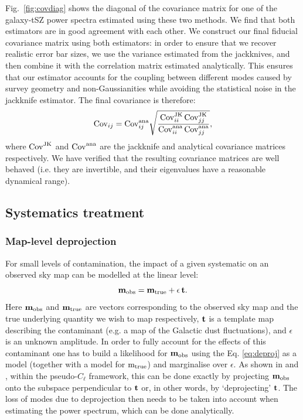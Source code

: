 \documentclass[useAMS,usenatbib]{mn2e}
\begin{document}
    Fig.\!~\ref{fig:covdiag} shows the diagonal of the covariance matrix for one of the galaxy-tSZ power spectra estimated using these two methods. We find that both estimators are in good agreement with each other. We construct our final fiducial covariance matrix using both estimators: in order to ensure that we recover realistic error bar sizes, we use the variance estimated from the jackknives, and then combine it with the correlation matrix estimated analytically. This ensures that our estimator accounts for the coupling between different modes caused by survey geometry and non-Gaussianities while avoiding the statistical noise in the jackknife estimator. The final covariance is therefore:
    \begin{equation}
      {\rm Cov}_{ij} = {\rm Cov}^{\rm ana}_{ij} \sqrt{\frac{{\rm Cov}^{\rm JK}_{ii}\,{\rm Cov}^{\rm JK}_{jj}}{{\rm Cov}^{\rm ana}_{ii}\,{\rm Cov}^{\rm ana}_{jj}}},
    \end{equation}
    where ${\rm Cov}^{\rm JK}$ and ${\rm Cov}^{\rm ana}$ are the jackknife and analytical covariance matrices respectively. We have verified that the resulting covariance matrices are well behaved (i.e. they are invertible, and their eigenvalues have a reasonable dynamical range).

  \subsection{Systematics treatment}\label{ssec:methods.syst}
    \subsubsection{Map-level deprojection}\label{sssec:methods.syst.deproj}
      For small levels of contamination, the impact of a given systematic on an observed sky map can be modelled at the linear level:
      \begin{equation}\label{eq:deproj}
        {\bf m}_{\rm obs}={\bf m}_{\rm true} + \epsilon\,{\bf t}.
      \end{equation}
      Here ${\bf m}_{\rm obs}$ and ${\bf m}_{\rm true}$ are vectors corresponding to the observed sky map and the true underlying quantity we wish to map respectively, ${\bf t}$ is a template map describing the contaminant (e.g. a map of the Galactic dust fluctuations), and $\epsilon$ is an unknown amplitude. In order to fully account for the effects of this contaminant one has to build a likelihood for ${\bf m}_{\rm obs}$ using the Eq. \ref{eq:deproj} as a model (together with a model for ${\rm m}_{\rm true}$) and marginalise over $\epsilon$. As shown in \cite{2017MNRAS.465.1847E} and \cite{2019MNRAS.484.4127A}, within the pseudo-$C_\ell$ framework, this can be done exactly by projecting ${\bf m}_{\rm obs}$ onto the subspace perpendicular to ${\bf t}$ or, in other words, by `deprojecting' ${\bf t}$. The loss of modes due to deprojection then needs to be taken into account when estimating the power spectrum, which can be done analytically.
\end{document}
